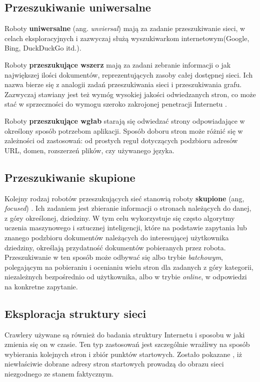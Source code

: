 \subsection{Przeszukiwanie uniwersalne}
\label{subsec:przUniw}
Roboty \textbf{uniwersalne} (ang. \emph{unviersal}) \cite[s. 311-315]{webMining} mają za zadanie przeszukiwanie sieci, w celach eksploracyjnych i zazwyczaj służą wyszukiwarkom internetowym(Google, Bing, DuckDuckGo itd.).

Roboty \textbf{przeszukujące wszerz} mają za zadani zebranie informacji o jak największej ilości dokumentów, reprezentujących zasoby całej dostępnej sieci. Ich nazwa bierze się z analogii zadań przeszukiwania sieci i przeszukiwania grafu. Zazwyczaj stawiany jest też wymóg wysokiej jakości odwiedzanych stron, co może stać w sprzeczności do wymogu szeroko zakrojonej penetracji Internetu \cite{webCrawling}.

Roboty \textbf{przeszukujące wgłab} \cite{webCrawling} starają się odwiedzać strony odpowiadające w określony sposób potrzebom aplikacji. Sposób doboru stron może różnić się w zależności od zastosowań: od prostych reguł dotyczących podzbioru adresów URL, domen, rozszerzeń plików, czy używanego języka. 

\subsection{Przeszukiwanie skupione}
\label{subsec:przSkup}
Kolejny rodzaj robotów przeszukujących sieć stanowią roboty \textbf{skupione} (ang, \emph{focused}) \cite{FocusedCrawlers}. Ich zadaniem jest zbieranie informacji o stronach należących do danej, z góry określonej, dziedziny. W tym celu wykorzystuje się często algorytmy uczenia maszynowego i sztucznej inteligencji\cite[s. 327-330]{webMining}, które na podstawie zapytania lub znanego podzbioru dokumentów należących do interesującej użytkownika dziedziny, określają przydatność dokumentów pobieranych przez robota. Przeszukiwanie w ten sposób może odbywać się albo trybie \emph{batchowym}, polegającym na pobieraniu i ocenianiu wielu stron dla zadanych z góry kategorii, niezależnych bezpośrednio od użytkownika, albo w trybie \emph{online}, w odpowiedzi na konkretne zapytanie.

\subsection{Eksploracja struktury sieci}
\label{subsec:eksplStr}
Crawlery używane są również do badania struktury Internetu i sposobu w jaki zmienia się on w czasie. Ten typ zastosowań jest szczególnie wrażliwy na sposób wybierania kolejnych stron i zbiór punktów startowych. Zostało pokazane \cite{biasedCrawlers}, iż niewłaściwie dobrane adresy stron startowych prowadzą do obrazu sieci niezgodnego ze stanem faktycznym.

